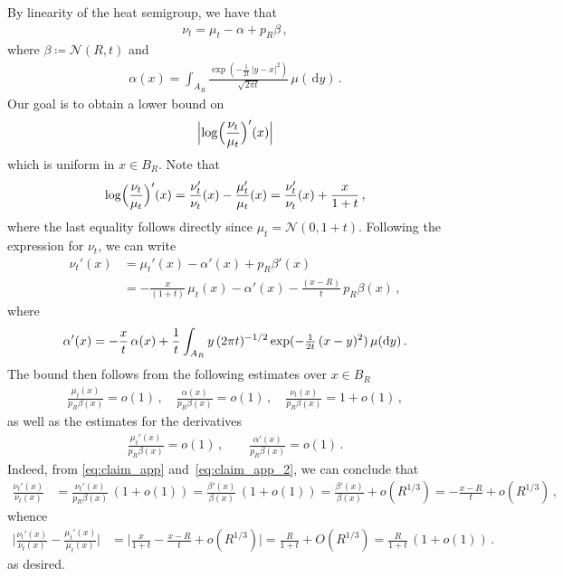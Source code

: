 \documentclass[12pt]{article}
\newcommand{\cN}{\mathcal{N}}
\newcommand{\1}{\mathds{1}}
\newcommand*{\rd}{\mathrm{d}}
\newcommand*{\dd}{\, \rd}
\newcommand{\deq}{\coloneqq}
\theoremstyle{plain}
\theoremstyle{definition}
\theoremstyle{remark}
\begin{document}
By linearity of the heat semigroup, we have that
\begin{align*}
    \nu_t = \mu_t - \alpha + p_R \beta\,,
\end{align*}
where $\beta \deq \cN(R,t)$ and
\begin{align*}
    \alpha(x) = \int_{A_R} \frac{\exp(-\frac{1}{2t}\,|y-x|^2)}{\sqrt{2\pi t}}\, \mu(\!\dd y)\,.
\end{align*}
Our goal is to obtain a lower bound on 
\begin{align*}
    \Bigl|\log\Bigl(\frac{\nu_t}{\mu_t}\Bigr)'(x)\Bigr|
\end{align*}
which is uniform in $x \in B_R$. Note that
\begin{align*}
    \log\Bigl(\frac{\nu_t}{\mu_t}\Bigr)'(x) = \frac{\nu_t'}{\nu_t}(x) - \frac{\mu_t'}{\mu_t}(x) = \frac{\nu_t'}{\nu_t}(x) + \frac{x}{1+t}\,,
\end{align*}
where the last equality follows directly since $\mu_t = \cN(0,1+t)$. Following the expression for $\nu_t$, we can write
\begin{align*}
    \nu_t'(x) &= \mu_t'(x) - \alpha'(x) + p_R \beta'(x) \\
    &=-\frac{x}{(1+t)}\,\mu_t(x) - \alpha'(x) - \frac{(x-R)}{t}\,p_R\beta(x)\,,
\end{align*}
where 
\begin{align*}
    \alpha'(x) = -\frac{x}{t}\,\alpha(x) + \frac{1}{t}\int_{A_R}y\, (2\pi t)^{-1/2}\exp(-\tfrac{1}{2t}\,(x-y)^2)\, \mu({\rm d}y)\,.
\end{align*}
The bound then follows from the following estimates over $x \in B_R$
\begin{align}\label{eq:claim_app}
    \frac{\mu_t(x)}{p_R\beta (x)} = o(1)\,, \quad \frac{\alpha(x)}{p_R\beta (x)} = o(1)\,, \quad \frac{\nu_t(x)}{p_R\beta (x)} = 1+o(1)\,,
\end{align}
{as well as the estimates for the derivatives}
\begin{align}\label{eq:claim_app_2}
    \frac{\mu_t'(x)}{p_R \beta(x)} = o(1)\,, \qquad \frac{\alpha'(x)}{p_R\beta(x)} = o(1)\,.
\end{align}
Indeed, from \eqref{eq:claim_app} and~\eqref{eq:claim_app_2}, we can conclude that
\begin{align*}
    \frac{\nu_t'(x)}{\nu_t(x)}
    &= \frac{\nu_t'(x)}{p_R \beta(x)}\,(1+o(1))
    = \frac{\beta'(x)}{\beta(x)}\,(1+o(1))
    = \frac{\beta'(x)}{\beta(x)} + o(R^{1/3})
    = -\frac{x-R}{t} + o(R^{1/3})\,,
\end{align*}
whence
\begin{align*}
    \bigl\lvert \frac{\nu_t'(x)}{\nu_t(x)} - \frac{\mu_t'(x)}{\mu_t(x)}\bigr\rvert
    &= \bigl\lvert \frac{x}{1+t} - \frac{x-R}{t} + o(R^{1/3})\bigr\rvert
    = \frac{R}{1+t} + O(R^{1/3})
    = \frac{R}{1+t}\,(1+o(1))\,.
\end{align*}
as desired.
\end{document}

